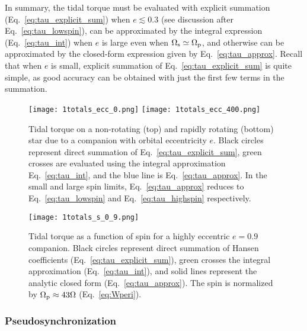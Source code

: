 \documentclass[
        fleqn,
        usenatbib,
    ]{mnras}
\begin{document}
In summary, the tidal torque must be evaluated with explicit summation
(Eq.~\ref{eq:tau_explicit_sum}) when $e\lesssim 0.3$ (see discussion after
Eq.~\ref{eq:tau_lowspin}), can be approximated by the
integral expression (Eq.~\ref{eq:tau_int}) when $e$ is large even when
$\Omega_{\rm s} \simeq \Omega_{\rm p}$, and otherwise can be approximated by the
closed-form expression given by Eq.~\eqref{eq:tau_approx}. Recall that when $e$
is small, explicit summation of Eq.~\eqref{eq:tau_explicit_sum} is quite simple,
as good accuracy can be obtained with just the first few terms in the summation.
\begin{figure}
    \centering
    \texttt{[image: 1totals\_ecc\_0.png]}
    \texttt{[image: 1totals\_ecc\_400.png]}
    \caption{Tidal torque on a non-rotating (top) and rapidly rotating (bottom)
    star due to a companion with orbital eccentricity $e$. Black circles
    represent direct summation of Eq.~\eqref{eq:tau_explicit_sum}, green
    crosses are evaluated using the integral approximation
    Eq.~\eqref{eq:tau_int}, and the blue line is Eq.~\eqref{eq:tau_approx}. In
    the small and large spin limits, Eq.~\eqref{eq:tau_approx} reduces to
    Eq.~\eqref{eq:tau_lowspin} and Eq.~\eqref{eq:tau_highspin} respectively.
    }\label{fig:totals_ecc0}
\end{figure}
\begin{figure}
    \centering
    \texttt{[image: 1totals\_s\_0\_9.png]}
    \caption{Tidal torque as a function of spin for a highly eccentric $e = 0.9$
    companion. Black circles represent direct summation of Hansen coefficients
    (Eq.~\ref{eq:tau_explicit_sum}), green crosses the integral approximation
    (Eq.~\ref{eq:tau_int}), and solid lines represent the analytic closed form
    (Eq.~\ref{eq:tau_approx}). The spin is normalized by $\Omega_{\rm p}
    \approx 43 \Omega$ (Eq.~\ref{eq:Wperi}). }\label{fig:totals_s}
\end{figure}

\subsubsection{Pseudosynchronization}\label{ss:pseudosynchronization}
\end{document}
